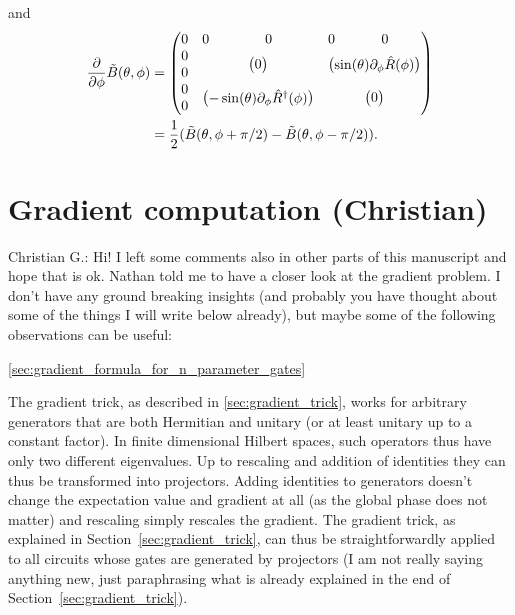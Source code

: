 \documentclass[aps,pra,10pt,twocolumn,groupedaddress,nofootinbib]{revtex4-1}
\theoremstyle{plain}
\newcommand{\pd}[2]{\frac{\partial #1}{\partial #2}}  %
\newcommand{\Admap}[1]{\tilde{#1}} %
\newcommand{\cg}[1]{\textcolor{cyan!80!black}{Christian G.: #1}}
\begin{document}
and
\begin{align*}
\pd{}{\phi} \Admap{B}(\theta, \phi)
&=
\begin{pmatrix}
  0 & 0 & 0 & 0 & 0\\
  0 & \block(2,2){0} & \block(2,2){\sin(\theta)\partial_\phi\hat{R}(\phi)}\\
  0\\
  0 & \block(2,2){-\sin(\theta)\partial_\phi\hat{R}^\dagger(\phi)} & \block(2,2){0}\\
  0
\end{pmatrix}\\
&=
\frac{1}{2}(\Admap{B}(\theta, \phi+\pi/2)
-\Admap{B}(\theta, \phi-\pi/2)).
\end{align*}



\section{Gradient computation (Christian)}
\cg{Hi! I left some comments also in other parts of this manuscript and hope that is ok. Nathan told me to have a closer look at the gradient problem. I don't have any ground breaking insights (and probably you have thought about some of the things I will write below already), but maybe some of the following observations can be useful:}

\ref{sec:gradient_formula_for_n_parameter_gates}

The gradient trick, as described in \ref{sec:gradient_trick}, works for arbitrary generators that are both Hermitian and unitary (or at least unitary up to a constant factor).
In finite dimensional Hilbert spaces, such operators thus have only two different eigenvalues.
Up to rescaling and addition of identities they can thus be transformed into projectors.
Adding identities to generators doesn't change the expectation value and gradient at all (as the global phase does not matter) and rescaling simply rescales the gradient.
The gradient trick, as explained in Section~\ref{sec:gradient_trick}, can thus be straightforwardly applied to all circuits whose gates are generated by projectors (I am not really saying anything new, just paraphrasing what is already explained in the end of Section~\ref{sec:gradient_trick}).
\end{document}
